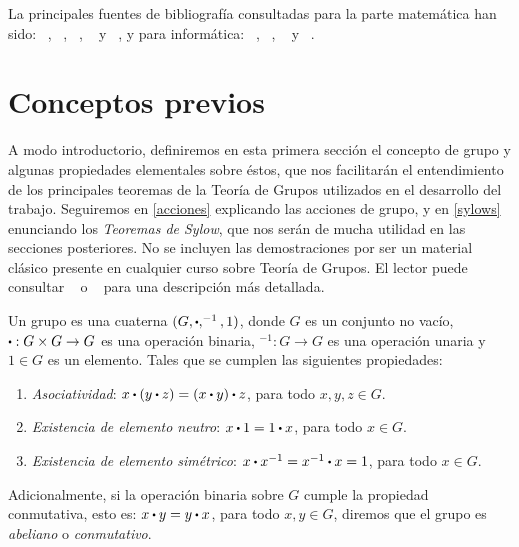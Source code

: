 La principales fuentes de bibliografía consultadas para la parte matemática han sido: ~\cite{abstractrojo}, ~\cite{abstract}, ~\cite{milneGT}, ~\cite{free} y ~\cite{Barrera}, y para informática: ~\cite{green}, ~\cite{tool}, ~\cite{kmill} y ~\cite{Pedrito}.



\newpage


\section{Conceptos previos}

A modo introductorio, definiremos en esta primera sección el concepto de grupo y algunas propiedades elementales sobre éstos, que nos facilitarán el entendimiento de los principales teoremas de la Teoría de Grupos utilizados en el desarrollo del trabajo. Seguiremos en \ref{acciones} explicando las acciones de grupo, y en \ref{sylows} enunciando los \textit{Teoremas de Sylow}, que nos serán de mucha utilidad en las secciones posteriores.
No se incluyen las demostraciones por ser un material clásico presente en cualquier curso sobre Teoría de Grupos.  El lector puede consultar  ~\cite{bueso} o ~\cite{milneGT} para una descripción más detallada.

\begin{definition} \label{defgrupo}
Un grupo es una cuaterna $(G,\bigcdot,^{-1},1)$, donde $G$ es un conjunto no vacío, $\bigcdot:G\times G\rightarrow G$ es una operación binaria, $^{-1}:G\rightarrow G$ es una operación unaria y $1\in G$ es un elemento. Tales que se cumplen las siguientes propiedades:
\end{definition}

\begin{enumerate}
\item \textit{Asociatividad}:
	 $x\bigcdot(y\bigcdot z) = (x\bigcdot y)\bigcdot z$, para todo $x,y,z \in G$.
	 
\item \textit{Existencia de elemento neutro}:  $x\bigcdot 1 = 1\bigcdot x$,  para todo $x\in G$.

\item \textit{Existencia de elemento simétrico}: $x\bigcdot x^{-1} = x^{-1}\bigcdot x =1$,  para todo $x\in G$.
\end{enumerate}

Adicionalmente, si la operación binaria sobre $G$ cumple la propiedad conmutativa, esto es: $x\bigcdot y=y\bigcdot x$, para todo $x,y\in G$,  diremos que el grupo es \textit{abeliano} o \textit{conmutativo}.







